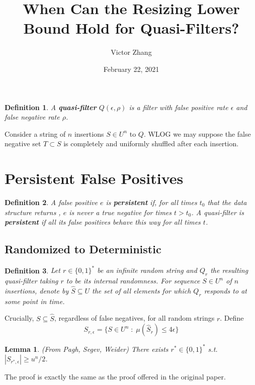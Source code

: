 \documentclass{article}
\title{When Can the Resizing Lower Bound Hold for Quasi-Filters?}
\author{Victor Zhang}
\date{February 22, 2021}
\newtheorem{definition}{Definition}[section]
\newtheorem{lemma}{Lemma}[section]
\begin{document}
\maketitle

\begin{definition}
A \textbf{quasi-filter} $Q(\epsilon,\rho)$ is a filter with false positive rate $\epsilon$ and false negative rate $\rho$.
\end{definition}
Consider a string of $n$ insertions $S \in U^n$ to $Q$. WLOG we may suppose the false negative set $T \subset S$ is completely and uniformly shuffled after each insertion.

\section{Persistent False Positives}
\begin{definition}
A false positive $e$ is \textbf{persistent} if, for all times $t_0$ that the data structure returns , $e$ is never a true negative for times $t > t_0$. A quasi-filter is \textbf{persistent} if all its false positives behave this way for all times $t$.
\end{definition}

\subsection{Randomized to Deterministic}
\begin{definition}
Let $r \in \{0,1\}^*$ be an infinite random string and $Q_r$ the resulting quasi-filter taking $r$ to be its internal randomness. For sequence $S \in U^n$ of $n$ insertions, denote by $\hat{S} \subseteq U$ the set of all elements for which $Q_r$ responds  to at some point in time.
\end{definition}
Crucially, $S \subseteq \hat{S}$, regardless of false negatives, for all random strings $r$. Define
$$S_{r,\epsilon} = \{S \in U^n \;:\; \mu(\hat{S}_r) \leq 4\epsilon \}$$

\begin{lemma}
(From Pagh, Segev, Weider) There exists $r^* \in \{0,1\}^*$ s.t. $|S_{r^*,\epsilon}| \geqslant u^n/2$.
\end{lemma}
The proof is exactly the same as the proof offered in the original paper.
\end{document}
